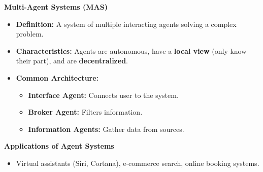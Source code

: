 \documentclass[a4paper, 8pt]{extarticle}
\newcommand{\subsectionheading}[1]{\normalsize\textbf{#1}}
\begin{document}
\begin{multicols}{2}
\subsectionheading{Multi-Agent Systems (MAS)}
\begin{itemize}
    \item \textbf{Definition:} A system of multiple interacting agents solving a complex problem.
    \item \textbf{Characteristics:} Agents are autonomous, have a \textbf{local view} (only know their part), and are \textbf{decentralized}.
    \item \textbf{Common Architecture:} 
    \begin{itemize}
        \item \textbf{Interface Agent:} Connects user to the system.
        \item \textbf{Broker Agent:} Filters information.
        \item \textbf{Information Agents:} Gather data from sources.
    \end{itemize}
\end{itemize}

\subsectionheading{Applications of Agent Systems}
\begin{itemize}
    \item Virtual assistants (Siri, Cortana), e-commerce search, online booking systems.
\end{itemize}


\end{multicols}
\end{document}
